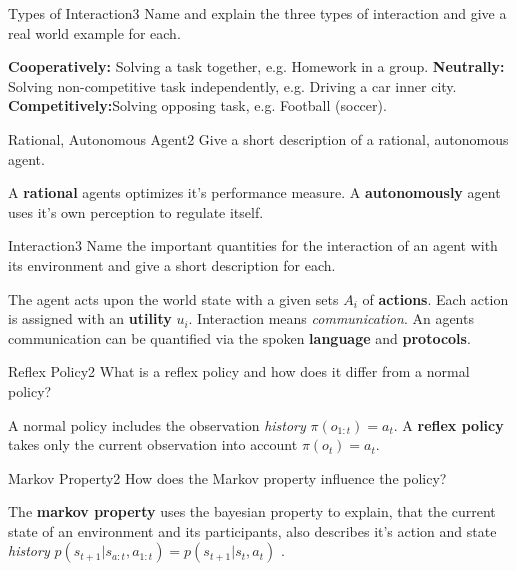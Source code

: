\documentclass[twoside,english,colorbacktitle,accentcolor=tud9c,10pt]{tudexercise}
\begin{document}
\begin{questions}

\begin{question}{Types of Interaction}{3}{}
	Name and explain the three types of interaction and give a real world example for each.
\end{question}
\newline
		\newline
		\textbf{Cooperatively:} Solving a task together, e.g. Homework in a group.
		\newline
		\textbf{Neutrally:} Solving non-competitive task independently, e.g. Driving a car inner city.
		\newline
		\textbf{Competitively:}Solving opposing task, e.g. Football (soccer).
		\newline
		
\begin{question}{Rational, Autonomous Agent}{2}{}
	Give a short description of a rational, autonomous agent.
	
\end{question}



	 A \textbf{rational} agents optimizes it's performance measure. A \textbf{autonomously} agent uses it's own perception to regulate itself.
	\newline	

\begin{question}{Interaction}{3}{}
	Name the important quantities for the interaction of an agent with its environment and give a short description for each.
\end{question}
	\newline
\newline
The agent acts upon the world state with a given sets $A_i$ of \textbf{actions}. Each action is assigned with an \textbf{utility} $u_i$.
	Interaction means \textit{communication}. An agents communication can be quantified via the spoken \textbf{language} and \textbf{protocols}.
	\newline	

\begin{question}{Reflex Policy}{2}{}
	What is a reflex policy and how does it differ from a normal policy?
\end{question}
	\newline
\newline
	A normal policy includes the observation \textit{history} $\pi(o_{1:t})= a_t $.
	A \textbf{reflex policy} takes only the current observation into account $\pi(o_t)=a_t$.
	\newline	
\newpage
\begin{question}{Markov Property}{2}{}
	How does the Markov property influence the policy?
\end{question}
	\newline
\newline
The \textbf{markov property} uses the bayesian property to explain, that the current state of an environment and its participants, also describes it's action and state \textit{history} $p( s_{t+1}|s_{a:t} , a_{1:t} ) = p(s_{t+1}|s_t,a_t)$ .
	\newline	


\end{questions}
\end{document}
